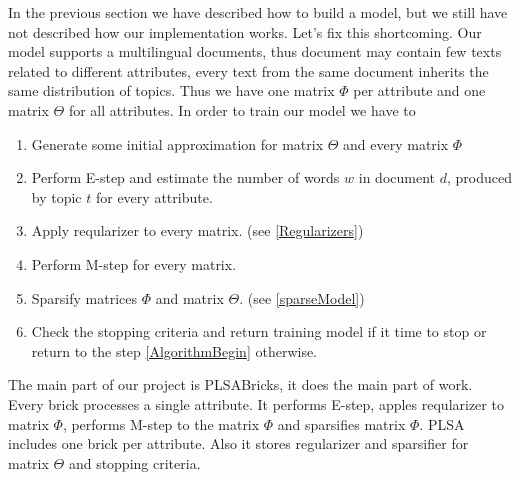 In the previous section we have described how to build a model, but we still have not described how our implementation works. 
Let's fix this shortcoming. Our model supports a multilingual documents, thus document may contain few texts related to different attributes, every text from the same document inherits the same distribution of topics. Thus we have one matrix $\Phi$ per
attribute and one matrix $\Theta$ for all attributes. In order to train our model we have to
\begin{enumerate}
    \item Generate some initial approximation for matrix $\Theta$ and every matrix $\Phi$
    \item \label{AlgorithmBegin} Perform E\--step and estimate the number of words $w$ in document $d$, produced by topic $t$ for every attribute.
    \item Apply reqularizer to every matrix. (see \ref{Regularizers})
    \item Perform M\--step for every matrix.
    \item Sparsify matrices $\Phi$ and matrix $\Theta$. (see \ref{sparseModel})
    \item Check the stopping criteria and return training model if it time to stop or return to the step \ref{AlgorithmBegin} otherwise.   
\end{enumerate}

The main part of our project is PLSABricks, it does the main part of work. Every brick processes a single attribute. It performs E\--step, apples
reqularizer to matrix $\Phi$, performs M\--step to the matrix $\Phi$ and sparsifies matrix $\Phi$. PLSA includes one brick per attribute. Also it stores
regularizer and sparsifier for matrix $\Theta$ and stopping criteria.  
